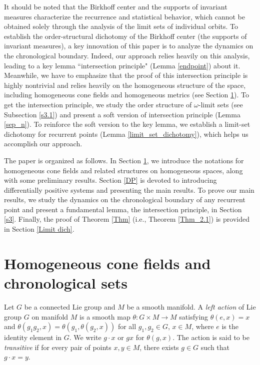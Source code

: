 \documentclass[a4paper,11pt]{article}
\theoremstyle{plain}
\theoremstyle{definition}
\numberwithin{equation}{section}
\begin{document}
It should be noted that the Birkhoff center and the supports of invariant measures characterize the recurrence and statistical behavior, which cannot be obtained solely through the analysis of the limit sets of individual orbits. To establish the order-structural dichotomy of the Birkhoff center (the supports of invariant measures), a key innovation of this paper is to analyze the dynamics on the chronological boundary. Indeed, our approach relies heavily on this analysis, leading to a key lemma ``intersection principle" (Lemma \ref{endpoint}) about it. Meanwhile, we have to emphasize that the proof of this intersection principle is highly nontrivial and relies heavily on the homogeneous structure of the space, including homogeneous cone fields and homogeneous metrics (see Section \ref{s2}). To get the intersection principle, we study the order structure of $\omega$-limit sets (see Subsection \ref{s3.1}) and present a soft version of intersection principle (Lemma \ref{sep_n}). To reinforce the soft version to the key lemma, we establish a limit-set dichotomy for recurrent points (Lemma \ref{limit_set_dichotomy}), which helps us accomplish our approach.
	
\vskip 4mm
	




The paper is organized as follows. In Section \ref{s2}, we introduce the notations for homogeneous cone fields and related structures on homogeneous spaces, along with some preliminary results. Section \ref{DP} is devoted to introducing differentially positive systems and presenting the main results. To prove our main results, we study the dynamics on the chronological boundary of any recurrent point and present a fundamental lemma, the intersection principle, in Section \ref{s3}. Finally, the proof of Theorem \ref{Thm} (i.e., Theorem \ref{Thm_2.1}) is provided in Section \ref{Limit dich}.

		
\noindent\section{Homogeneous cone fields and chronological sets}\label{s2}




Let $G$ be a connected Lie group and $M$ be a smooth manifold. A \textit{left action} of Lie group $G$ on manifold $M$ is a smooth map $\theta \colon G \times M \to M$ satisfying $\theta(e,x)=x$ and $\theta(g_1g_2,x)=\theta(g_1,\theta(g_2,x))$ for all $g_1,g_2\in G$, $x\in M$, where $e$ is the identity element in $G$. We write $g\cdot x$ or $gx$ for $\theta(g,x)$. The action is said to be \textit{transitive} if for every pair of points $x,y\in M$, there exists $g\in G$ such that $g\cdot x=y$. 
\end{document}

